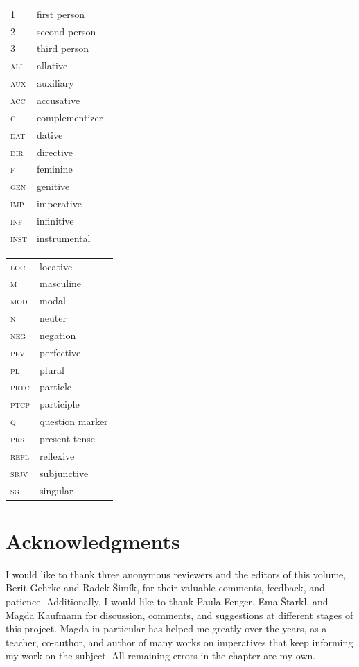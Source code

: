 \documentclass[output=paper,colorlinks,citecolor=brown]{langscibook}
\begin{document}
\begin{tabularx}{.5\textwidth}{@{}lQ}
	\textsc{1}&first person\\	
    \textsc{2}&second person\\
	\textsc{3}&third person\\
	\textsc{all}&allative\\
    \textsc{aux}&auxiliary\\
	\textsc{acc}&accusative\\
	\textsc{c}&complementizer\\
    \textsc{dat}&dative\\
    \textsc{dir}&directive\\
	\textsc{f}&feminine\\
	\textsc{gen}&genitive\\
	\textsc{imp}&imperative\\
	\textsc{inf}&infinitive\\
	\textsc{inst}&instrumental\\
\end{tabularx}%
\begin{tabularx}{.5\textwidth}{lQ@{}}
	\textsc{loc}&locative\\
    \textsc{m}&masculine\\
    \textsc{mod}&modal\\
	\textsc{n}&neuter\\	
    \textsc{neg}&negation\\
    \textsc{pfv}&perfective\\ 
    \textsc{pl}&plural\\
	\textsc{prtc}&particle\\
	\textsc{ptcp}&participle\\
	\textsc{q}&question marker\\
	\textsc{prs}&present tense\\
	\textsc{refl}&reflexive\\
	\textsc{sbjv}&subjunctive\\
	\textsc{sg}&singular\\
\end{tabularx}

\section*{Acknowledgments}
I would like to thank three anonymous reviewers and the editors of this volume, Berit Gehrke and Radek \v{S}im\'ik, for their valuable comments, feedback, and patience. Additionally, I would like to thank Paula Fenger, Ema \v{S}tarkl, and Magda Kaufmann for discussion, comments, and suggestions at different stages of this project. Magda in particular has helped me greatly over the years, as a teacher, co-author, and author of many works on imperatives that keep informing my work on the subject. All remaining errors in the chapter are my own. 

\sloppy
\printbibliography[heading=subbibliography,notkeyword=this]
\end{document}
